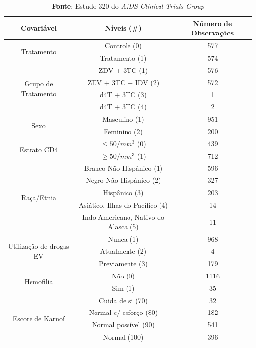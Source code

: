 \documentclass[
	12pt,				%
	openright,			%
	twoside,			%
	a4paper,			%
	english,			%
	brazil				%
	]{abntex2}
\begin{document}
\begin{table}[!ht]
	\caption{Descrição das Covariáveis qualitativas, seus níveis e respectivos números de observações}
    \label{tab:expdesccovar}
    \centering
	\begin{tabular}{ccc}
    	\hline
		Covariável & Níveis (\#) &Número de Observações \\\hline
        \multirow{2}{*}{Tratamento} & Controle (0) & 
         577\\
        						\   & Tratamento (1) & 574\\\hline
        \multirow{4}{*}{Grupo de Tratamento} & ZDV + 3TC (1) & 
         576\\
         						\	& ZDV + 3TC + IDV (2) & 572 \\
                                \	& d4T + 3TC (3) & 1 \\
                                \	& d4T + 3TC (4) & 2 \\\hline				\multirow{2}{*}{Sexo} & Masculino (1) & 951 \\
         						\ & Feminino (2) & 200 \\\hline
        \multirow{2}{*}{Estrato CD4} & $\leq 50/mm^3$ (0) & 439 \\
         						\ & $\geq 50/mm^3$ (1) & 712\\\hline
         \multirow{5}{*}{Raça/Etnia} & Branco Não-Hispânico (1) & 596 \\
         						\ & Negro Não-Hispânico (2) & 327\\
                                \ & Hispânico (3) & 203 \\
                                \ & Asiático, Ilhas do Pacífico (4) & 14\\
                                \ & Indo-Americano, Nativo do Alasca (5) & 11 \\\hline	
         \multirow{3}{*}{Utilização de drogas EV} & Nunca (1) & 968 \\
         						\ & Atualmente (2) & 4 \\
                                \ & Previamente (3) & 179 \\\hline
         \multirow{2}{*}{Hemofilia} & Não (0) & 1116 \\
         						\	& Sim (1) & 35 \\\hline
          \multirow{4}{*}{Escore de Karnof} & Cuida de si (70) & 32 \\
          						\ & Normal c/ esforço (80) & 182\\
                                \ & Normal possível (90) & 541 \\
                                \ & Normal (100) & 396\\\hline
                                
         
	\end{tabular}
    \caption*{\tiny{\textbf{Fonte}: Estudo 320 do \textit{AIDS Clinical Trials Group}}} 
\end{table}
\end{document}
